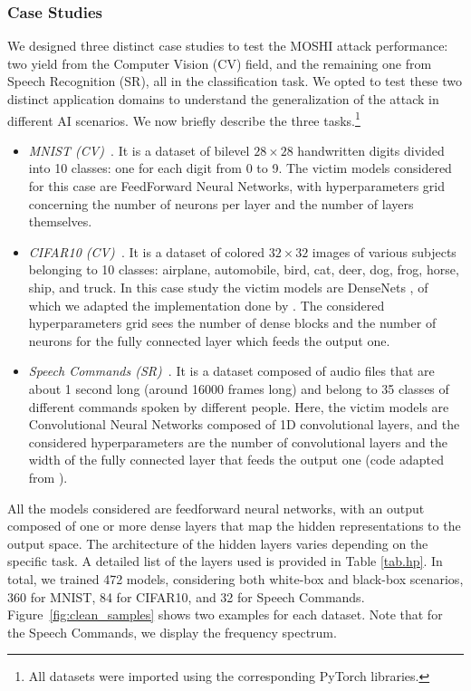 \subsubsection{Case Studies}
\label{subsub:cases}
We designed three distinct case studies to test the MOSHI attack performance: two yield from the Computer Vision (CV) field, and the remaining one from Speech Recognition (SR), all in the classification task.
We opted to test these two distinct application domains to understand the generalization of the attack in different AI scenarios. 
We now briefly describe the three tasks.\footnote{All datasets were imported using the corresponding PyTorch libraries.} 
\begin{itemize}
    \item \textit{MNIST (CV)~\cite{lecun2010mnist}}. It is a dataset of bilevel $28 \times 28$ handwritten digits divided into 10 classes: one for each digit from 0 to 9. The victim models considered for this case are FeedForward Neural Networks, with hyperparameters grid concerning the number of neurons per layer and the number of layers themselves. 
    \item \textit{CIFAR10 (CV)~\cite{cifar10}}. It is a dataset of colored $32 \times 32$ images of various subjects belonging to 10 classes: airplane, automobile, bird, cat, deer, dog, frog, horse, ship, and truck. In this case study the victim models are DenseNets \cite{huang2017densely}, of which we adapted the implementation done by \cite{PyTorchDenseNet}. The considered hyperparameters grid sees the number of dense blocks and the number of neurons for the fully connected layer which feeds the output one.
    \item \textit{Speech Commands (SR)~\cite{speechcommandsdataset}}. It is a dataset composed of audio files that are about 1 second long (around 16000 frames long) and belong to 35 classes of different commands spoken by different people. Here, the victim models are Convolutional Neural Networks composed of 1D convolutional layers, and the considered hyperparameters are the number of convolutional layers and the width of the fully connected layer that feeds the output one (code adapted from \cite{PyTorchSpeechCommands}).
\end{itemize}
All the models considered are feedforward neural networks, with an output composed of one or more dense layers that map the hidden representations to the output space.
The architecture of the hidden layers varies depending on the specific task. A detailed list of the layers used is provided in Table \ref{tab.hp}.
In total, we trained 472 models, considering both white-box and black-box scenarios, 360 for MNIST, 84 for CIFAR10, and 32 for Speech Commands. 
Figure~\ref{fig:clean_samples} shows two examples for each dataset. Note that for the Speech Commands, we display the frequency spectrum. 

